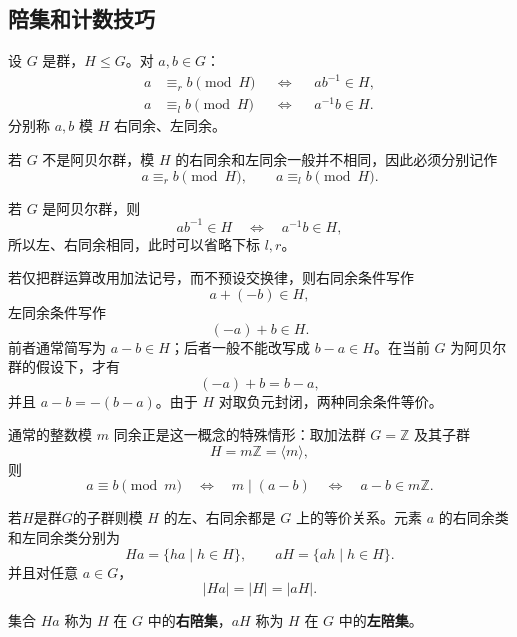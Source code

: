 \subsection{陪集和计数技巧}

\begin{definition}[模子群的同余]\label{def:congruence-mod-subgroup}
设 $G$ 是群，$H\leq G$。对 $a,b\in G$：
\begin{align*}
  a&\equiv_r b\pmod H &&\Longleftrightarrow&& ab^{-1}\in H,\\
  a&\equiv_l b\pmod H &&\Longleftrightarrow&& a^{-1}b\in H.
\end{align*}
分别称 $a,b$ 模 $H$ 右同余、左同余。
\end{definition}

\begin{purplenote}
若 $G$ 不是阿贝尔群，模 $H$ 的右同余和左同余一般并不相同，因此必须分别记作
\[
  a\equiv_r b\pmod H,
  \qquad
  a\equiv_l b\pmod H.
\]

若 $G$ 是阿贝尔群，则
\[
  ab^{-1}\in H\quad\Longleftrightarrow\quad a^{-1}b\in H,
\]
所以左、右同余相同，此时可以省略下标 $l,r$。

若仅把群运算改用加法记号，而不预设交换律，则右同余条件写作
\[
  a+(-b)\in H,
\]
左同余条件写作
\[
  (-a)+b\in H.
\]
前者通常简写为 $a-b\in H$；后者一般不能改写成 $b-a\in H$。在当前 $G$ 为阿贝尔群的假设下，才有
\[
  (-a)+b=b-a,
\]
并且 $a-b=-(b-a)$。由于 $H$ 对取负元封闭，两种同余条件等价。

通常的整数模 $m$ 同余正是这一概念的特殊情形：取加法群 $G=\mathbb Z$ 及其子群
\[
  H=m\mathbb Z=\langle m\rangle,
\]
则
\[
  a\equiv b\pmod m
  \quad\Longleftrightarrow\quad
  m\mid(a-b)
  \quad\Longleftrightarrow\quad
  a-b\in m\mathbb Z.
\]
\end{purplenote}

\begin{theorem}\label{thm:cosets-equivalence}
若$H$是群$G$的子群则模 $H$ 的左、右同余都是 $G$ 上的等价关系。元素 $a$ 的右同余类和左同余类分别为
\[
  Ha=\{ha\mid h\in H\},
  \qquad
  aH=\{ah\mid h\in H\}.
\]
并且对任意 $a\in G$，
\[
  |Ha|=|H|=|aH|.
\]
\end{theorem}

\begin{definition}[陪集]\label{def:coset}
集合 $Ha$ 称为 $H$ 在 $G$ 中的\textbf{右陪集}，$aH$ 称为 $H$ 在 $G$ 中的\textbf{左陪集}。
\end{definition}

